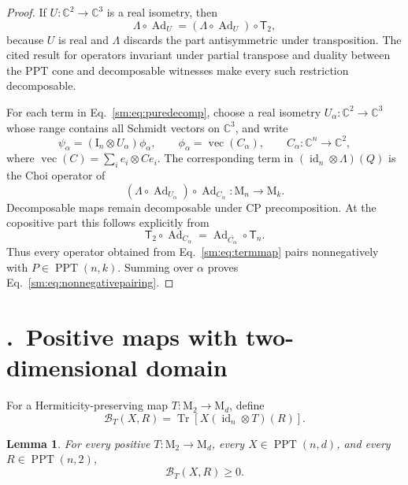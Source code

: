 \documentclass[aps,prl,reprint,superscriptaddress,nofootinbib]{revtex4-2}
\newcommand{\M}{\mathrm{M}}
\newcommand{\I}{\mathrm{I}}
\newcommand{\C}{\mathbb C}
\newcommand{\id}{\operatorname{id}}
\newcommand{\Ad}{\operatorname{Ad}}
\newcommand{\Tr}{\operatorname{Tr}}
\newcommand{\PPT}{\operatorname{PPT}}
\newcommand{\vecop}{\operatorname{vec}}
\newcommand{\cB}{\mathcal B}
\newcommand{\Tmap}{\mathsf T}
\newtheorem{lemma}[theorem]{Lemma}
\newcommand{\suppsection}[2]{%
 \refstepcounter{section}%
 \section*{\thesection.\ #1}%
 \label{sm:#2}}
\begin{document}
\begin{proof}
If \(U:\C^2\to\C^3\) is a real isometry, then
\begin{equation}
 \Lambda\circ\Ad_U
 =(\Lambda\circ\Ad_U)\circ\Tmap_2,
\label{sm:eq:realrestriction}
\end{equation}
because \(U\) is real and \(\Lambda\) discards the part antisymmetric under
transposition.  The cited result for operators invariant under partial
transpose and duality between the PPT cone and decomposable witnesses make
every such restriction decomposable.

For each term in Eq.~\eqref{sm:eq:puredecomp}, choose a real isometry
\(U_\alpha:\C^2\to\C^3\) whose range contains all Schmidt vectors on $\C^3$,
and write
\begin{equation}
 \psi_\alpha=(\I_n\otimes U_\alpha)\phi_\alpha,
 \qquad \phi_\alpha=\vecop(C_\alpha),\qquad
 C_\alpha:\C^n\to\C^2,
\label{sm:eq:vectorization}
\end{equation}
where \(\vecop(C)=\sum_i e_i\otimes Ce_i\).  The corresponding term in
\((\id_n\otimes\Lambda)(Q)\) is the Choi operator of
\begin{equation}
 (\Lambda\circ\Ad_{U_\alpha})\circ\Ad_{C_\alpha}:
 \M_n\to\M_k.
\label{sm:eq:termmap}
\end{equation}
Decomposable maps remain decomposable under CP precomposition.  At the
copositive part this follows explicitly from
\begin{equation}
 \Tmap_2\circ\Ad_{C_\alpha}
 =\Ad_{\overline{C_\alpha}}\circ\Tmap_n.
\label{sm:eq:transposeprecomp}
\end{equation}
Thus every operator obtained from Eq.~\eqref{sm:eq:termmap} pairs
nonnegatively with \(P\in\PPT(n,k)\).  Summing over \(\alpha\) proves
Eq.~\eqref{sm:eq:nonnegativepairing}.
\end{proof}

\suppsection{Positive maps with two-dimensional domain}{sec:normalform}

For a Hermiticity-preserving map \(T:\M_2\to\M_d\), define
\begin{equation}
 \cB_T(X,R)=\Tr\!\left[X(\id_n\otimes T)(R)\right].
\label{sm:eq:bilinear}
\end{equation}

\begin{lemma}
\label{sm:thm:bilinear}
For every positive \(T:\M_2\to\M_d\), every
\(X\in\PPT(n,d)\), and every \(R\in\PPT(n,2)\),
\begin{equation}
 \cB_T(X,R)\geq0.
\label{sm:eq:bilinearpositive}
\end{equation}
\end{lemma}
\end{document}
